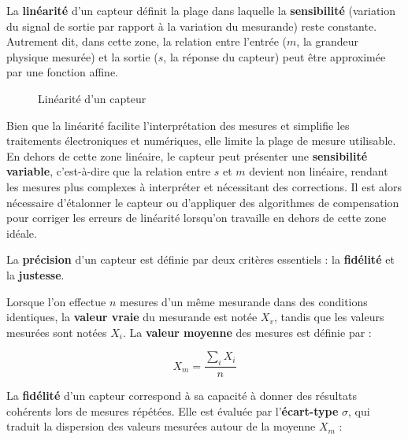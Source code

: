 La \textbf{linéarité} d'un capteur définit la plage dans laquelle la 
\textbf{sensibilité} (variation du signal de sortie par rapport à la variation 
du mesurande) reste constante. Autrement dit, dans cette zone, la relation entre 
l'entrée (\( m \), la grandeur physique mesurée) et la sortie (\( s \), la
réponse du capteur) peut être approximée par une fonction affine.\par

\begin{figure}[!ht]
    \caption{Linéarité d'un capteur}
    \label{figLineaire}
\end{figure}

Bien que la linéarité facilite l'interprétation des mesures et simplifie les 
traitements électroniques et numériques, elle limite la plage de mesure utilisable. 
En dehors de cette zone linéaire, le capteur peut présenter une 
\textbf{sensibilité variable}, c'est-à-dire que la relation entre \( s \) et
\( m \) devient non linéaire, rendant les mesures plus complexes à interpréter 
et nécessitant des corrections. Il est alors nécessaire
d'étalonner le capteur ou d'appliquer des algorithmes de compensation pour 
corriger les erreurs de linéarité lorsqu'on travaille en dehors de cette zone 
idéale.

La \textbf{précision} d'un capteur est définie par deux critères essentiels : 
la \textbf{fidélité} et la \textbf{justesse}.  

Lorsque l'on effectue \( n \) mesures d'un même mesurande dans des conditions 
identiques, la \textbf{valeur vraie} du mesurande est notée \( X_v \), tandis 
que les valeurs mesurées sont notées \( X_i \). La \textbf{valeur moyenne} des 
mesures est définie par :  

\[
X_m = \frac{\sum_{i} X_i}{n}
\]

La \textbf{fidélité} d'un capteur correspond à sa capacité à donner des 
résultats cohérents lors de mesures répétées. Elle est évaluée par 
l'\textbf{écart-type} \( \sigma \), qui traduit la dispersion des valeurs 
mesurées autour de la moyenne \( X_m \) :  

